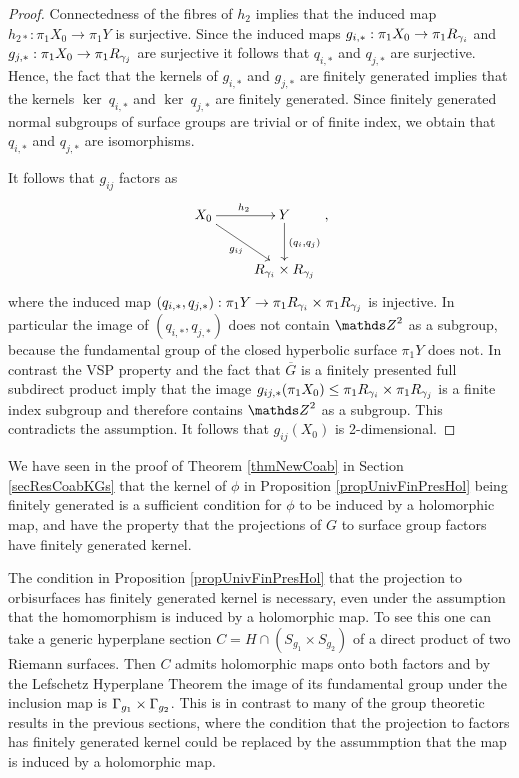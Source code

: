 \begin{proof}
 Connectedness of the fibres of $h_2$ implies that the induced map $h_{2\ast} : \pi_1 X_0\rightarrow \pi_1 Y$ is surjective. Since the induced maps $g_{i,\ast}: \pi_1 X_0\rightarrow \pi_1 R_{\gamma_i}$ and $g_{j,\ast}: \pi_1 X_0\rightarrow \pi_1 R_{\gamma_j}$ are surjective it follows that $q_{i,\ast}$ and $q_{j,\ast}$ are surjective. Hence, the fact that the kernels of $g_{i,\ast}$ and $g_{j,\ast}$ are finitely generated implies that the kernels $\ker ~ q_{i,\ast}$ and $\ker ~ q_{j,\ast}$ are finitely generated. Since finitely generated normal subgroups of surface groups are trivial or of finite index, we obtain that $q_{i,\ast}$ and $q_{j,\ast}$ are isomorphisms.
 
 It follows that $g_{ij}$ factors as
 \[
  \xymatrix{ X_0 \ar[r]^{h_2}\ar[rd]_{g_{ij}}  & Y \ar[d] ^{(q_i,q_j)} \\ & R_{\g_i}\times R_{\g_j}},
 \]
 where the induced map $(q_{i,\ast},q_{j,\ast}):\pi_1 Y \rightarrow \pi_1 R_{\gamma_i}\times \pi_1 R_{\gamma_j}$ is injective. In particular the image of $(q_{i,\ast},q_{j,\ast})$ does not contain $\ZZ^2$ as a subgroup, because the fundamental group of the closed hyperbolic surface $\pi_1 Y$ does not. In contrast the VSP property and the fact that $\overline{G}$ is a finitely presented full subdirect product imply that the image $g_{ij,\ast}(\pi_1 X_0) \leq \pi_1 R_{\gamma_i}\times \pi_1 R_{\gamma_j}$ is a finite index subgroup and therefore contains $\ZZ^2$ as a subgroup. This contradicts the assumption. It follows that $g_{ij}(X_0)$ is 2-dimensional. 
\end{proof}

\begin{remark}
We have seen in the proof of Theorem \ref{thmNewCoab} in Section \ref{secResCoabKGs} that the kernel of $\phi$ in Proposition \ref{propUnivFinPresHol} being finitely generated is a sufficient condition for $\phi$ to be induced by a holomorphic map, and have the property that the projections of $G$ to surface group factors have finitely generated kernel.
\end{remark}

\begin{remark}
The condition in Proposition \ref{propUnivFinPresHol} that the projection to orbisurfaces has finitely generated kernel is necessary, even under the assumption that the homomorphism is induced by a holomorphic map. To see this one can take a generic hyperplane section $C=H\cap (S_{g_1}\times S_{g_2})$ of a direct product of two Riemann surfaces. Then $C$ admits holomorphic maps onto both factors and by the Lefschetz Hyperplane Theorem the image of its fundamental group under the inclusion map is $\Gamma_{g_1}\times \Gamma_{g_2}$. This is in contrast to many of the group theoretic results in the previous sections, where the condition that the projection to factors has finitely generated kernel could be replaced by the assummption that the map is induced by a holomorphic map.
\end{remark}

